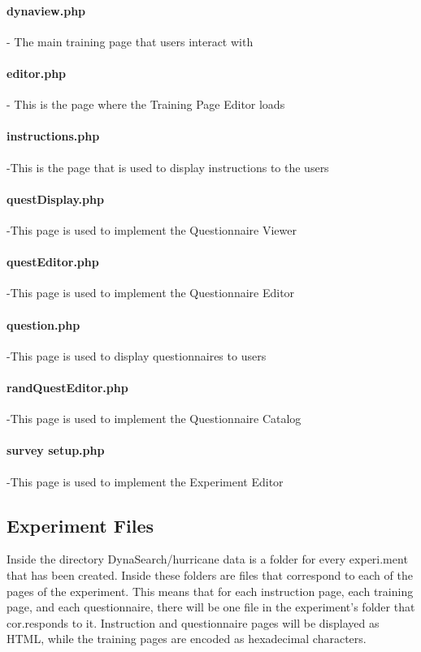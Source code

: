 \documentclass[article]{ij4uq}              %
\begin{document}
\paragraph{dynaview.php} - The main training page that users interact with

\paragraph{editor.php} - This is the page where the Training Page Editor loads

\paragraph{instructions.php} -This is the page that is used to display instructions to the users 

\paragraph{questDisplay.php} -This page is used to implement the Questionnaire Viewer

\paragraph{questEditor.php} -This page is used to implement the Questionnaire Editor 

\paragraph{question.php} -This page is used to display questionnaires to users 

\paragraph{randQuestEditor.php} -This page is used to implement the Questionnaire Catalog 

\paragraph{survey setup.php} -This page is used to implement the Experiment Editor

\subsection{Experiment Files}
Inside the directory DynaSearch/hurricane data is a folder for every experi.ment that has been created. Inside these folders are files that correspond to each of the pages of the experiment. This means that for each instruction page, each training page, and each questionnaire, there will be one file in the experiment's folder that cor.responds to it. Instruction and questionnaire pages will be displayed as HTML, while the training pages are encoded as hexadecimal characters.
\end{document}
